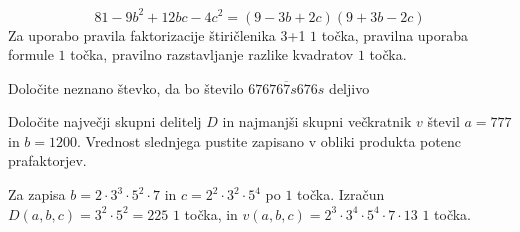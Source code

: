 \documentclass[addpoints]{exam}
\begin{document}
\begin{questions}
\begin{parts}
        \begin{solution}[3cm]
            $$81-9b^2+12bc-4c^2=(9-3b+2c)(9+3b-2c)$$
            Za uporabo pravila faktorizacije štiričlenika 3+1 $1$ točka, pravilna uporaba formule $1$ točka, pravilno razstavljanje razlike kvadratov $1$ točka.
        \end{solution}


    \end{parts}


    \newpage

    \question
    Določite neznano števko, da bo število $\overline{676767s676s}$ deljivo




    \question[4]
    Določite največji skupni delitelj $D$ in najmanjši skupni večkratnik $v$ števil $a=777$ in $b=1200$.
    Vrednost slednjega pustite zapisano v obliki produkta potenc prafaktorjev.

    \begin{solution}[8cm]
        Za zapisa $b=2\cdot 3^3\cdot 5^2\cdot 7$ in $c=2^2\cdot 3^2\cdot 5^4$ po $1$ točka. 
        Izračun $D(a,b,c)=3^2\cdot 5^2=225$ $1$ točka, in $v(a,b,c)=2^3\cdot 3^4\cdot 5^4\cdot 7\cdot 13$ $1$ točka.
    \end{solution}
    

\end{questions}
\end{document}
